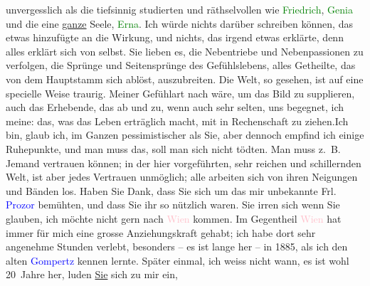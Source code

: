                     unvergesslich als die tiefsinnig studierten und räthselvollen wie \textcolor{green}{Friedrich}{}, \textcolor{green}{Genia}{} und die eine \uline{ganze} Seele, \textcolor{green}{Erna}{}. {\pb}Ich würde nichts darüber
                    schreiben können, das etwas hinzufügte an die Wirkung, und nichts, das irgend
                    etwas erklärte, denn alles erklärt sich von selbst.\pend
           \pstart
           Sie lieben es, die Nebentriebe und Nebenpassionen zu verfolgen, die Sprünge und
                    Seitensprünge des Gefühlslebens, alles Getheilte, das von dem Hauptstamm sich
                    ablöst, auszubreiten. Die Welt, so gesehen, ist auf eine specielle Weise
                    traurig. Meiner Gefühlart nach wäre, um das Bild zu supplieren, auch das
                    Erhebende, das ab und zu, wenn auch sehr selten, uns begegnet, ich meine: das,
                    was das Leben erträglich macht,  mit in
                    Rechenschaft zu ziehen.\hspace*{2em}Ich bin, glaub ich, im
                    Ganzen pessimistischer als Sie, aber dennoch empfind ich einige Ruhepunkte, und
                    man muss das, soll man sich nicht tödten. Man muss z. B. Jemand vertrauen
                    können; {\pb}in der hier
                    vorgeführten, sehr reichen und schillernden Welt, ist aber jedes Vertrauen
                    unmöglich; alle arbeiten sich von ihren Neigungen und Bänden los.\pend
           \pstart
           Haben Sie Dank, dass Sie sich um das mir unbekannte Frl. \textcolor{blue}{Prozor}{}\ledrightnote{\textcolor{blue}{Grete Prozor}} bemühten, und dass Sie ihr so nützlich waren.\pend
           \pstart
           Sie irren sich wenn Sie glauben, ich möchte nicht gern nach \textcolor{pink}{Wien}{}\ledrightnote{\textcolor{pink}{Wien}} kommen. Im Gegentheil \textcolor{pink}{Wien}{}\ledrightnote{\textcolor{pink}{Wien}} hat immer für mich eine grosse Anziehungskraft gehabt; ich habe
                    dort sehr angenehme Stunden verlebt, besonders – es ist lange her – in
                        1885, als ich den alten \textcolor{blue}{Gompertz}{}\ledrightnote{\textcolor{blue}{Theodor Gomperz}} kennen lernte. Später einmal, ich weiss nicht wann, es ist
                    wohl 20 Jahre her, luden \uline{Sie} sich zu mir ein,
